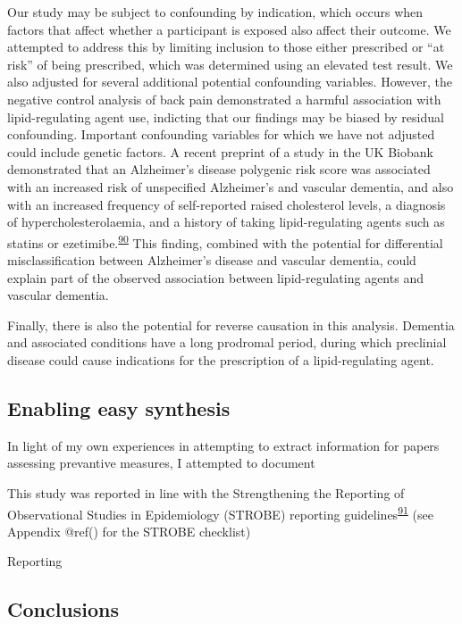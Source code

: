 \documentclass[a4paper, twoside]{templates/ociamthesis}
\begin{document}
Our study may be subject to confounding by indication, which occurs when factors that affect whether a participant is exposed also affect their outcome. We attempted to address this by limiting inclusion to those either prescribed or ``at risk'' of being prescribed, which was determined using an elevated test result. We also adjusted for several additional potential confounding variables. However, the negative control analysis of back pain demonstrated a harmful association with lipid-regulating agent use, indicting that our findings may be biased by residual confounding. Important confounding variables for which we have not adjusted could include genetic factors. A recent preprint of a study in the UK Biobank demonstrated that an Alzheimer's disease polygenic risk score was associated with an increased risk of unspecified Alzheimer's and vascular dementia, and also with an increased frequency of self-reported raised cholesterol levels, a diagnosis of hypercholesterolaemia, and a history of taking lipid-regulating agents such as statins or ezetimibe.\textsuperscript{\protect\hyperlink{ref-korologou-linden2020}{90}} This finding, combined with the potential for differential misclassification between Alzheimer's disease and vascular dementia, could explain part of the observed association between lipid-regulating agents and vascular dementia.

Finally, there is also the potential for reverse causation in this analysis. Dementia and associated conditions have a long prodromal period, during which preclinial disease could cause indications for the prescription of a lipid-regulating agent.

\hypertarget{enabling-easy-synthesis}{%
\subsection{Enabling easy synthesis}\label{enabling-easy-synthesis}}

In light of my own experiences in attempting to extract information for papers assessing prevantive measures, I attempted to document

This study was reported in line with the Strengthening the Reporting of Observational Studies in Epidemiology (STROBE) reporting guidelines\textsuperscript{\protect\hyperlink{ref-vandenbroucke2007}{91}} (see Appendix @ref() for the STROBE checklist)

Reporting

\hypertarget{conclusions}{%
\subsection{Conclusions}\label{conclusions}}
\end{document}

